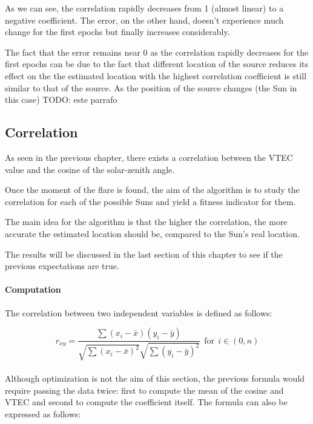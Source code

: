 As we can see, the correlation rapidly decreases from 1 (almost linear) to a negative coefficient. The error, on the other hand, doesn't experience much change for the first epochs but finally increases considerably. 

The fact that the error remains near 0 as the correlation rapidly decreases for the first epochs can be due to the fact that different location of the source reduces its effect on the  the estimated location with the highest correlation coefficient is still similar to that of the source. As the position of the source changes (the Sun in this case)  TODO: este parrafo

\subsection{Correlation}

As seen in the previous chapter, there exists a correlation between the VTEC value and the cosine of the solar-zenith angle. 

Once the moment of the flare is found, the aim of the algorithm is to study the correlation for each of the possible Suns and yield a fitness indicator for them. 

The main idea for the algorithm is that the higher the correlation, the more accurate the estimated location should be, compared to the Sun's real location. 

The results will be discussed in the last section of this chapter to see if the previous expectations are true.

\paragraph{Computation}

The correlation between two independent variables is defined as follows:

\begin{equation} \label{eq:coefficient}
r_{xy} = \frac{\sum(x_{i} - \bar{x})(y_{i} - \bar{y})}
{\sqrt{\sum(x_{i} - \bar{x})^{2}}
	\sqrt{\sum(y_{i} - \bar{y})^{2}}} \ \ \text{for} \ \ i \in (0, n)
\end{equation} \\

Although optimization is not the aim of this section, the previous formula would require passing the data twice: first to compute the mean of the cosine and VTEC and second to compute the coefficient itself. The formula can also be expressed as follows:

